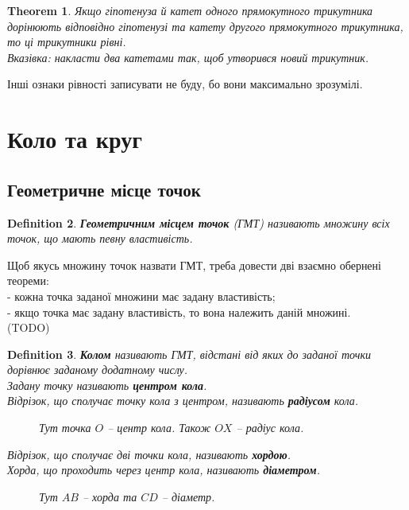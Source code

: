 \documentclass[a4paper, 10pt]{article}
\theoremstyle{theoremdd}
\newtheorem{theorem}{Theorem}[subsection]
\theoremstyle{theoremdd}
\theoremstyle{theoremdd}
\newtheorem{definition}[theorem]{Definition}
\theoremstyle{theoremdd}
\theoremstyle{theoremdd}
\theoremstyle{theoremdd}
\theoremstyle{theoremdd}
\theoremstyle{theoremdd}
\theoremstyle{theoremdd}
\begin{document}
\begin{theorem}
Якщо гіпотенуза й катет одного прямокутного трикутника дорінюють відповідно гіпотенузі та катету другого прямокутного трикутника, то ці трикутники рівні.\\
\textit{Вказівка: накласти два катетами так, щоб утворився новий трикутник.}
\end{theorem}
Інші ознаки рівності записувати не буду, бо вони максимально зрозумілі.
\newpage

\section{Коло та круг}
\subsection{Геометричне місце точок}
\begin{definition}
\textbf{Геометричним місцем точок} (ГМТ) називають множину всіх точок, що мають певну властивість.
\end{definition}
Щоб якусь множину точок назвати ГМТ, треба довести дві взаємно обернені теореми:\\
- кожна точка заданої множини має задану властивість;\\
- якщо точка має задану властивість, то вона належить даній множині.\\
(TODO)

\begin{definition}
\textbf{Колом} називають ГМТ, відстані від яких до заданої точки дорівнює заданому додатному числу.\\
Задану точку називають \textbf{центром кола}.\\
Відрізок, що сполучає точку кола з центром, називають \textbf{радіусом} кола.
\begin{figure}[H]
\centering
{}
\caption*{Тут точка $O$ -- центр кола. Також $OX$ -- радіус кола.}
\end{figure}
Відрізок, що сполучає дві точки кола, називають \textbf{хордою}.\\
Хорда, що проходить через центр кола, називають \textbf{діаметром}.
\begin{figure}[H]
\centering
{}
\caption*{Тут $AB$ -- хорда та $CD$ -- діаметр.}
\end{figure}
\end{definition}
\end{document}
